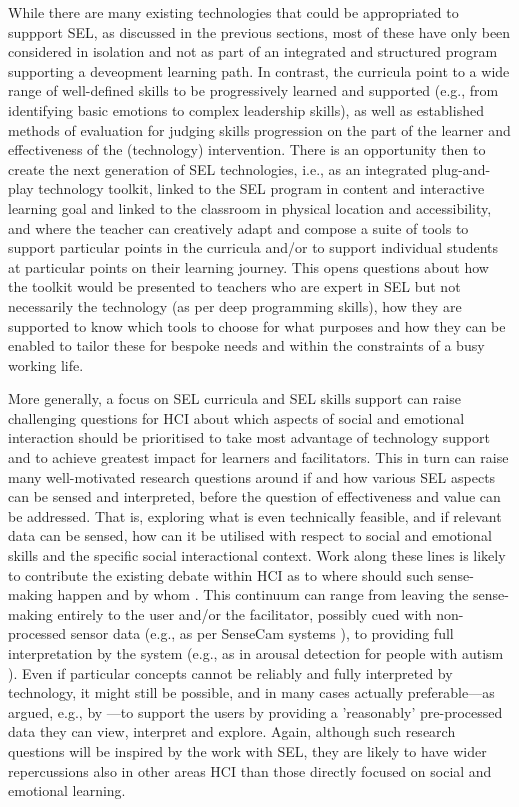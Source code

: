 \documentclass[prodmode,acmtochi]{acmsmall}
\begin{document}
While there are many existing technologies that could be appropriated to suppport SEL, as discussed in the previous sections, most of these have only been considered in isolation and not as part of an integrated and structured program supporting a deveopment learning path. In contrast, the curricula point to a wide range of well-defined skills to be progressively learned and supported (e.g., from identifying basic emotions to complex leadership skills), as well as established methods of evaluation for judging skills progression on the part of the learner and effectiveness of the (technology) intervention. There is an opportunity then to create the next generation of SEL technologies, i.e., as an integrated plug-and-play technology toolkit, linked to the SEL program in content and interactive learning goal and linked to the classroom in physical location and accessibility, and where the teacher can creatively adapt and compose a suite of tools to support particular points in the curricula and/or to support individual students at particular points on their learning journey.  This opens questions about how the toolkit would be presented to teachers who are expert in SEL but not necessarily the technology (as per deep programming skills), how they are supported to know which tools to choose for what purposes and how they can be enabled to tailor these for bespoke needs and within the constraints of a busy working life.


More generally, a focus on SEL curricula and SEL skills support can raise challenging questions for HCI about which aspects of social and emotional interaction should be prioritised to take most advantage of technology support and to achieve greatest impact for learners and facilitators. This in turn can raise many well-motivated research questions around if and how various SEL aspects can be sensed and interpreted, before the question of effectiveness and value can be addressed. That is, exploring what is even technically feasible, and if relevant data can be sensed, how can it be utilised with respect to social and emotional skills and the specific social interactional context.
%
Work along these lines is likely to contribute the existing debate within HCI as to where should such sense-making happen and by whom \cite{Sengers2007,Boehner2007}. This continuum can range from leaving the sense-making entirely to the user and/or the facilitator, possibly cued with non-processed sensor data (e.g., as per SenseCam systems \cite{Fleck2009}), to providing full interpretation by the system (e.g., as in arousal detection for people with autism \cite{Picard2009}). Even if particular concepts cannot be reliably and fully interpreted by technology, it might still be possible, and in many cases actually preferable---as argued, e.g., by \cite{Boehner2005,Mentis2014}---to support the users by providing a 'reasonably' pre-processed data they can view, interpret and explore. 
%
Again, although such research questions will be inspired by the work with SEL, they are likely to have wider repercussions also in other areas HCI than those directly focused on social and emotional learning.
\end{document}

